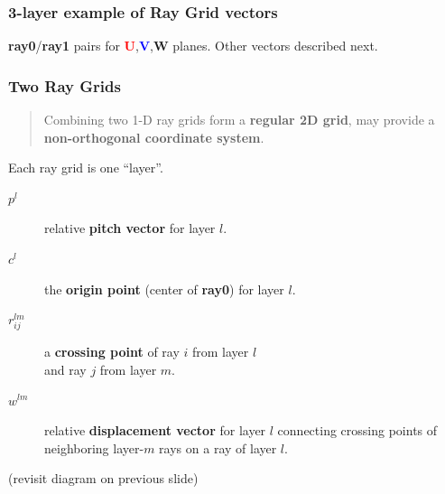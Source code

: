 \documentclass[xcolor=dvipsnames]{beamer}
\begin{document}
\begin{frame}
  \frametitle{3-layer example of Ray Grid vectors}
  \begin{center}
    \tiny
    

    \footnotesize
    \textbf{ray0}/\textbf{ray1} pairs for \textcolor{red}{\textbf{U}},\textcolor{blue}{\textbf{V}},\textbf{W} planes.
    Other vectors described next.

  \end{center}
\end{frame}

\begin{frame}
  \frametitle{Two Ray Grids}
  
  \begin{quote}
    Combining two 1-D ray grids form a \textbf{regular 2D grid}, may provide a \textbf{non-orthogonal coordinate system}.     
  \end{quote}

  Each ray grid is one ``layer''.
  \begin{description}
  \item[$p^l$] relative \textbf{pitch vector} for layer $l$.
  \item[$c^l$] the \textbf{origin point} (center of \textbf{ray0}) for layer $l$.
  \item[$r^{lm}_{ij}$] a \textbf{crossing point} of ray $i$ from layer $l$ \\
    and ray $j$ from layer $m$.
  \item[$w^{lm}$] relative \textbf{displacement vector} for layer $l$ connecting crossing points of neighboring layer-$m$ rays on a ray of layer $l$.
  \end{description}
  \begin{center}
    \footnotesize
    (revisit diagram on previous slide)
  \end{center}
\end{frame}
\end{document}
